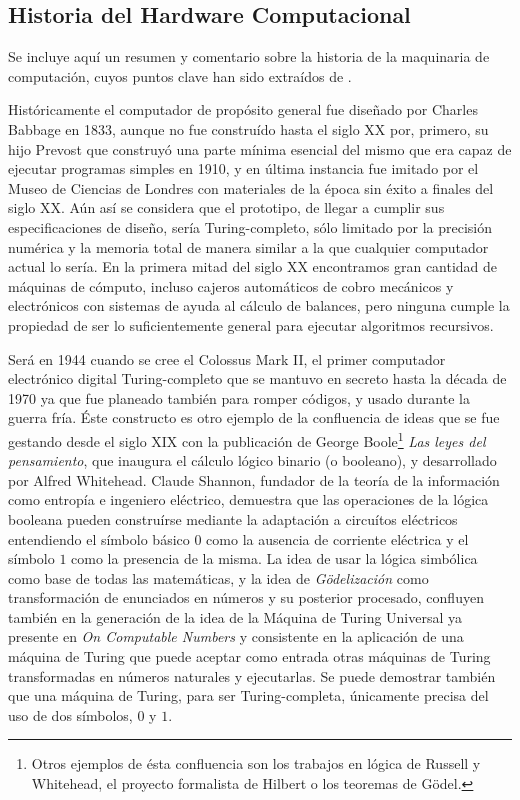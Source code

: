\documentclass[12pt]{memoir}
\begin{document}
\newpage

\begin{appendices}

\chapter{Historia del Hardware Computacional}
\label{compHis}

Se incluye aquí un resumen y comentario sobre la historia de la maquinaria de computación, cuyos puntos clave han sido extraídos de \parencite{wiki:computerhistory}.

Históricamente el computador de propósito general fue diseñado por Charles Babbage en 1833, aunque no fue construído hasta el siglo XX por, primero, su hijo Prevost que construyó una parte mínima esencial del mismo que era capaz de ejecutar programas simples en 1910, y en última instancia fue imitado por el Museo de Ciencias de Londres con materiales de la época sin éxito a finales del siglo XX. Aún así se considera que el prototipo, de llegar a cumplir sus especificaciones de diseño, sería Turing-completo, sólo limitado por la precisión numérica y la memoria total de manera similar a la que cualquier computador actual lo sería. En la primera mitad del siglo XX encontramos gran cantidad de máquinas de cómputo, incluso cajeros automáticos de cobro mecánicos y electrónicos con sistemas de ayuda al cálculo de balances, pero ninguna cumple la propiedad de ser lo suficientemente general para ejecutar algoritmos recursivos.

Será en 1944 cuando se cree el Colossus Mark II, el primer computador electrónico digital Turing-completo que se mantuvo en secreto hasta la década de 1970 ya que fue planeado también para romper códigos, y usado durante la guerra fría. Éste constructo es otro ejemplo de la confluencia de ideas que se fue gestando desde el siglo XIX con la publicación de George Boole\footnote{Otros ejemplos de ésta confluencia son los trabajos en lógica de Russell y Whitehead, el proyecto formalista de Hilbert o los teoremas de Gödel.} \textit{Las leyes del pensamiento}, que inaugura el cálculo lógico binario (o booleano), y desarrollado por Alfred Whitehead. Claude Shannon, fundador de la teoría de la información como entropía e ingeniero eléctrico, demuestra que las operaciones de la lógica booleana pueden construírse mediante la adaptación a circuítos eléctricos entendiendo el símbolo básico $0$ como la ausencia de corriente eléctrica y el símbolo $1$ como la presencia de la misma. La idea de usar la lógica simbólica como base de todas las matemáticas, y la idea de \textit{Gödelización} como transformación de enunciados en números y su posterior procesado, confluyen también en la generación de la idea de la Máquina de Turing Universal ya presente en \textit{On Computable Numbers} y consistente en la aplicación de una máquina de Turing que puede aceptar como entrada otras máquinas de Turing transformadas en números naturales y ejecutarlas. Se puede demostrar también que una máquina de Turing, para ser Turing-completa, únicamente precisa del uso de dos símbolos, $0$ y $1$. 


\end{appendices}
\end{document}
